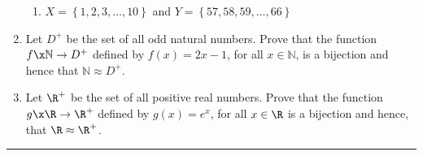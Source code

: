 \begin{previewactivity}
\begin{enumerate}
\begin{enumerate}
\item $X = \left\{ 1, 2, 3, \ldots, 10 \right\}$   and 
$Y = \left\{ 57, 58, 59, \ldots, 66 \right\}$
\end{enumerate}  

\item Let $D^+$ be the set of all odd natural numbers.   Prove that the function \linebreak
$f\x \mathbb{N} \to D^+$ defined by 
$f \left( x \right) = 2x - 1$, for all $x \in \mathbb{N}$,  is a bijection and hence that $\mathbb{N} \approx D^+$. 
\label{PA:equivalentsets5}%


\item Let $\R^+$ be the set of all positive real numbers.  Prove that the function 
\linebreak
$g\x \R \to \R^+$ defined by $g (x ) = e^x$, for all $x \in \R$ is a bijection and hence, that 
$\R \approx \R^+$.
\end{enumerate}
\end{previewactivity}
\hrule

